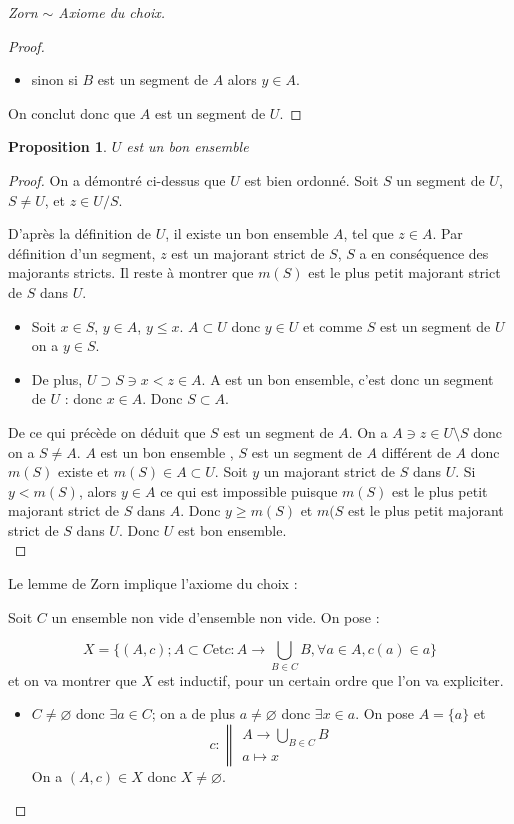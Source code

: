 \documentclass[12pt,a4paper]{amsart}
\newtheorem{prop}[thm]{\bf Proposition}
\begin{document}
\begin{proof}[Zorn $\sim$ Axiome du choix]
\begin{proof}
\begin{itemize}
\item sinon si $B$ est un segment de $A$ alors $y\in A$. 
\end{itemize}
 On conclut donc que $A $ est un segment de $U$.
\end{proof}

\begin{prop}
$U $ est un bon ensemble
\end{prop}

\begin{proof}
On a démontré ci-dessus que $U$ est bien ordonné. Soit $S$ un segment de $U$, $S \neq U$, et $z\in U/S$. 

D'après la définition de $U$, il existe un bon ensemble $A$, tel que $ z \in A$. Par définition d'un segment, $z$ est un majorant strict de $S$, $S$ a en conséquence des majorants stricts. Il reste à montrer que $m(S)$ est le plus petit majorant strict de $S $ dans $U$. 

\begin{itemize}
\item[1] Soit $x\in S$, $y \in A $, $y\leq x$. $A\subset U$ donc $y \in U $ et comme $S$ est un segment de $U$ on a $y \in S$. 
\item[2] De plus, $U\supset S \ni x <z \in A$. A est un bon ensemble, c'est donc un segment de $U$ : donc $x \in A$. Donc $S\subset A$.  
\end{itemize}
De ce qui précède on déduit que $S$ est un segment de $A$. On a $A \ni z \in U\setminus S$ donc on a $S \neq A$. $A$ est un bon ensemble , $S$ est un segment de $A$ différent de $A$ donc $m(S)$ existe et $m(S) \in A \subset U$. Soit $y$ un majorant strict de $S$ dans $U$. Si $y<m(S)$, alors $y \in A$  ce qui est impossible puisque $m(S)$ est le plus petit majorant strict de $S$ dans $A$. Donc $y\geq m(S)$ et $m(S$ est le plus petit majorant strict de $S$ dans $U$. Donc $U$ est bon ensemble. \\
\end{proof}
Le lemme de Zorn implique l'axiome du choix : 

Soit $C$ un ensemble non vide d'ensemble non vide. On pose : 

$$X= \{(A,c); A\subset C  \mbox{et}  c : A \rightarrow \bigcup_{B\in C} B , \forall a \in A , c(a) \in a \}$$
et on va montrer que $X$ est inductif, pour un certain ordre que l'on va expliciter. 

\begin{itemize}
\item $C\neq \varnothing $ donc $\exists a \in C $; on a de plus $a\neq \varnothing$ donc $\exists x \in a$. On pose $A=\{a\}$ et 
$$
c : \left\|
    \begin{array}{ll}
       A\rightarrow \bigcup_{B\in C} B  \\
       a\mapsto x
    \end{array}
\right.
$$
On a $(A,c) \in X$ donc $X\neq \varnothing$. 


\end{itemize}
\end{proof}
\end{document}
